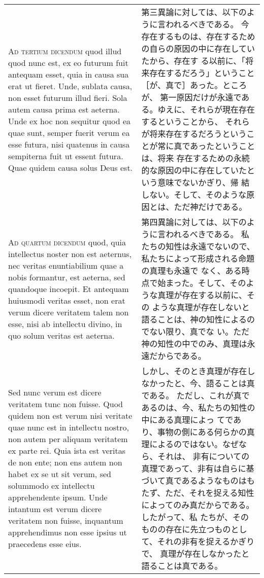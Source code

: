 \documentclass[10pt]{jsarticle} %
\begin{document}
\begin{longtable}{p{21em}p{21em}}
\\



{\scshape Ad tertium dicendum} quod illud quod
 nunc est, ex eo futurum fuit antequam esset, quia in causa sua erat ut
 fieret. Unde, sublata causa, non esset futurum illud fieri. Sola autem
 causa prima est aeterna. Unde ex hoc non sequitur quod ea quae sunt,
 semper fuerit verum ea esse futura, nisi quatenus in causa sempiterna
 fuit ut essent futura. Quae quidem causa solus Deus est.

&

第三異論に対しては、以下のように言われるべきである。
今存在するものは、存在するための自らの原因の中に存在していたから、存在す
 る以前に、「将来存在するだろう」ということ［が、真で］あった。ところが、
 第一原因だけが永遠である。ゆえに、それらが現在存在するということから、
 それらが将来存在するだろうということが常に真であったということは、将来
 存在するための永続的な原因の中に存在していたという意味でないかぎり、帰
 結しない。そして、そのような原因とは、ただ神だけである。

\\



{\scshape Ad quartum dicendum} quod, quia
 intellectus noster non est aeternus, nec veritas enuntiabilium quae a
 nobis formantur, est aeterna, sed quandoque incoepit. Et antequam
 huiusmodi veritas esset, non erat verum dicere veritatem talem non
 esse, nisi ab intellectu divino, in quo solum veritas est aeterna. 

&

第四異論に対しては、以下のように言われるべきである。
私たちの知性は永遠でないので、私たちによって形成される命題の真理も永遠で
 なく、ある時点で始まった。そして、そのような真理が存在する以前に、その
 ような真理が存在しないと語ることは、神の知性によるのでない限り、真でな
 い。ただ神の知性の中でのみ、真理は永遠だからである。

\\

Sed
 nunc verum est dicere veritatem tunc non fuisse. Quod quidem non est
 verum nisi veritate quae nunc est in intellectu nostro, non autem per
 aliquam veritatem ex parte rei. Quia ista est veritas de non ente; non
 ens autem non habet ex se ut sit verum, sed solummodo ex intellectu
 apprehendente ipsum. Unde intantum est verum dicere veritatem non
 fuisse, inquantum apprehendimus non esse ipsius ut praecedens esse
 eius.

&

しかし、そのとき真理が存在しなかったと、今、語ることは真である。
ただし、これが真であるのは、今、私たちの知性の中にある真理によっ
 てであり、事物の側にある何らかの真理によるのではない。なぜなら、それは、
 非有についての真理であって、非有は自らに基づいて真であるようなものはも
 たず、ただ、それを捉える知性によってのみ真だからである。したがって、私
 たちが、そのものの存在に先立つものとして、それの非有を捉えるかぎりで、
 真理が存在しなかったと語ることは真である。




\end{longtable}
\newpage
\end{document}
